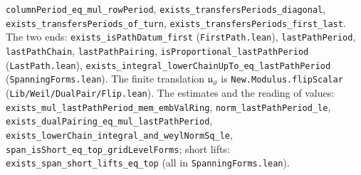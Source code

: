\documentclass[reqno]{amsart}
\theoremstyle{definition}
\theoremstyle{plain}
\newcommand{\tl}[1]{\texttt{#1}}
\begin{document}
\begin{sloppypar}
\tl{columnPeriod\_\allowbreak eq\_\allowbreak mul\_\allowbreak rowPeriod}, \tl{exists\_\allowbreak transfersPeriods\_\allowbreak diagonal}, \tl{exists\_\allowbreak transfersPeriods\_\allowbreak of\_\allowbreak turn}, \tl{exists\_\allowbreak transfersPeriods\_\allowbreak first\_\allowbreak last}.  The two ends: \tl{exists\_\allowbreak isPathDatum\_\allowbreak first} (\tl{FirstPath.lean}), \tl{lastPathPeriod}, \tl{lastPathChain}, \tl{lastPathPairing}, \tl{isProportional\_\allowbreak lastPathPeriod} (\tl{LastPath.lean}), \tl{exists\_\allowbreak integral\_\allowbreak lowerChainUpTo\_\allowbreak eq\_\allowbreak lastPathPeriod} (\tl{SpanningForms.lean}).  The finite translation \(\mathfrak u_\vartheta\) is \tl{New.\allowbreak Modulus.\allowbreak flipScalar} (\tl{Lib/\allowbreak Weil/\allowbreak DualPair/\allowbreak Flip.lean}).  The estimates and the reading of values: \tl{exists\_\allowbreak mul\_\allowbreak lastPathPeriod\_\allowbreak mem\_\allowbreak embValRing}, \tl{norm\_\allowbreak lastPathPeriod\_\allowbreak le}, \tl{exists\_\allowbreak dualPairing\_\allowbreak eq\_\allowbreak mul\_\allowbreak lastPathPeriod}, \tl{exists\_\allowbreak lowerChain\_\allowbreak integral\_\allowbreak and\_\allowbreak weylNormSq\_\allowbreak le}, \tl{span\_\allowbreak isShort\_\allowbreak eq\_\allowbreak top\_\allowbreak gridLevelForms}; short lifts: \tl{exists\_\allowbreak span\_\allowbreak short\_\allowbreak lifts\_\allowbreak eq\_\allowbreak top} (all in \tl{SpanningForms.lean}).
\end{sloppypar}
\end{document}
